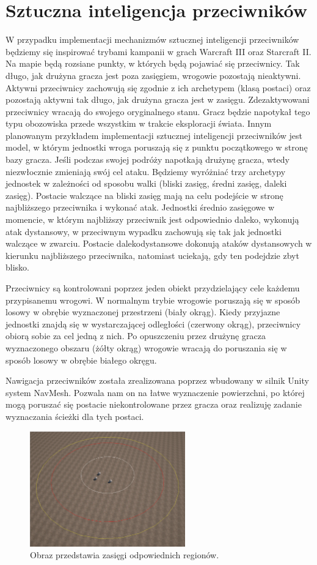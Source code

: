 \chapter{Sztuczna inteligencja przeciwników}

W przypadku implementacji mechanizmów sztucznej inteligencji przeciwników będziemy się inspirować trybami kampanii w grach Warcraft III oraz Starcraft II. 
Na mapie będą rozsiane punkty, w których będą pojawiać się przeciwnicy. 
Tak długo, jak drużyna gracza jest poza zasięgiem, wrogowie pozostają nieaktywni. 
Aktywni przeciwnicy zachowują się zgodnie z ich archetypem (klasą postaci) oraz pozostają aktywni tak długo, jak drużyna gracza jest w zasięgu. 
Zdezaktywowani przeciwnicy wracają do swojego oryginalnego stanu. Gracz będzie napotykał tego typu obozowiska przede wszystkim w trakcie eksploracji świata. 
Innym planowanym przykładem implementacji sztucznej inteligencji przeciwników jest model, w którym jednostki wroga poruszają się z punktu początkowego w stronę bazy gracza. 
Jeśli podczas swojej podróży napotkają drużynę gracza, wtedy niezwłocznie zmieniają swój cel ataku.
Będziemy wyróżniać trzy archetypy jednostek w zależności od sposobu walki (bliski zasięg, średni zasięg, daleki zasięg). 
Postacie walczące na bliski zasięg mają na celu podejście w stronę najbliższego przeciwnika i wykonać atak. 
Jednostki średnio zasięgowe w momencie, w którym najbliższy przeciwnik jest odpowiednio daleko, wykonują atak dystansowy, 
w przeciwnym wypadku zachowują się tak jak jednostki walczące w zwarciu. 
Postacie  dalekodystansowe dokonują ataków dystansowych w kierunku najbliższego przeciwnika, natomiast uciekają, gdy ten podejdzie zbyt blisko.

Przeciwnicy są kontrolowani poprzez jeden obiekt przydzielający cele każdemu przypisanemu wrogowi. W normalnym trybie wrogowie poruszają się w sposób losowy
w obrębie wyznaczonej przestrzeni (biały okrąg). Kiedy przyjazne jednostki znajdą się w wystarczającej odległości (czerwony okrąg), przeciwnicy obiorą sobie za cel jedną z nich.
Po opuszczeniu przez drużynę gracza wyznaczonego obszaru (żółty okrąg) wrogowie wracają do poruszania się w sposób losowy w obrębie białego okręgu.

Nawigacja przeciwników została zrealizowana poprzez wbudowany w silnik Unity system NavMesh. Pozwala nam on na łatwe wyznaczenie powierzchni, po której mogą poruszać
się postacie niekontrolowane przez gracza oraz realizuję zadanie wyznaczania ścieżki dla tych postaci.

\begin{figure}[h]
\centering
\includegraphics[width=0.6\textwidth]{images/ai}
\caption{Obraz przedstawia zasięgi odpowiednich regionów.}
\end{figure}

